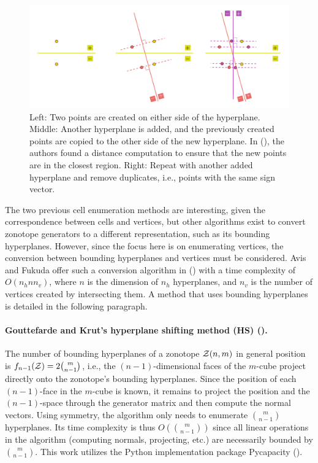 \begin{figure}[!htb]
  \captionsetup{justification=centering}
  \centering
  \includegraphics[trim={20 0 20 0},clip,width=1\linewidth]{img/chapter_2/gu_et_al_alg.pdf}
  \caption{Left: Two points are created on either side of the hyperplane. Middle: Another hyperplane is added, and the previously created points are copied to the other side of the new hyperplane. In (\cite{guCounterfactualIdentificationLatent2022}), the authors found a distance computation to ensure that the new points are in the closest region. Right: Repeat with another added hyperplane and remove duplicates, i.e., points with the same sign vector.}
  \label{fig:gu_et_al_algo}
\end{figure}

The two previous cell enumeration methods are interesting, given the correspondence between cells and vertices, but other algorithms exist to convert zonotope generators to a different representation, such as its bounding hyperplanes. However, since the focus here is on enumerating vertices, the conversion between bounding hyperplanes and vertices must be considered. Avis and Fukuda offer such a conversion algorithm in (\cite{avisPivotingAlgorithmConvex}) with a time complexity of $O(n_h n n_v)$, where $n$ is the dimension of $n_h$ hyperplanes, and $n_v$ is the number of vertices created by intersecting them. A method that uses bounding hyperplanes is detailed in the following paragraph.

\paragraph*{Gouttefarde and Krut's hyperplane shifting method (HS) (\cite{gouttefardeCharacterizationParallelManipulator2010a}).}
The number of bounding hyperplanes of a zonotope $\mathcal{Z}(n,m)$ in general position is $f_{n-1}(\mathcal{Z}) = 2\binom{m}{n-1}$, i.e., the $(n-1)$-dimensional faces of the $m$-cube project directly onto the zonotope's bounding hyperplanes. Since the position of each $(n-1)$-face in the $m$-cube is known, it remains to project the position and the $(n-1)$-space through the generator matrix and then compute the normal vectors. Using symmetry, the algorithm only needs to enumerate $\binom{m}{n-1}$ hyperplanes. Its time complexity is thus $O(\binom{m}{n-1})$ since all linear operations in the algorithm (computing normals, projecting, etc.) are necessarily bounded by $\binom{m}{n-1}$. This work utilizes the Python implementation package Pycapacity (\cite{skuricPycapacityRealtimeTaskspace2023}).

